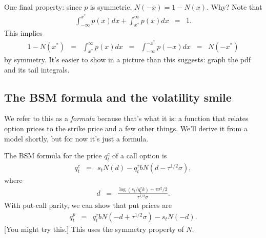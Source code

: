 \documentclass[11pt]{article}
\begin{document}
One final property:  since $p$ is symmetric, $N(-x) = 1 - N(x)$.
Why?
Note that
\begin{eqnarray*}
\int_{-\infty}^{x^*} p(x) dx + \int_{x^*}^{\infty} p(x) dx &=& 1 .
\end{eqnarray*}
This implies
\begin{eqnarray*}
     1 - N(x^*) &=& \int_{x^*}^{\infty} p(x) dx \;\;=\;\; \int_{-\infty}^{-x^*} p(-x) dx
            \;\;=\;\; N(-x^*)
\end{eqnarray*}
by symmetry.
It's easier to show in a picture than this suggests:
graph the pdf and its tail integrals.


\subsection*{The BSM formula and the volatility smile}


We refer to this as a {\it formula\/} because that's what it is:
a function that relates option prices to the strike price
and a few other things.  We'll derive it from a model shortly,
but for now it's just a formula.

The BSM formula for the price $q^c_t$ of a call option is
\begin{eqnarray}
        q^c_t &=& s_t N(d) - q^\tau_t b N (d - \tau^{1/2}\sigma ),
        \label{eq:bsm-call}
\end{eqnarray}
where
\begin{eqnarray*}
          d &=& \frac{\log(s_t/q^\tau_t k) + \tau \sigma^2/2}{\tau^{1/2}\sigma} .
\end{eqnarray*}
With put-call parity, we can show that put prices are
\begin{eqnarray}
        q^p_t &=& q^\tau_t b N(-d + \tau^{1/2} \sigma) - s_t N(-d) .
        \label{eq:bsm-put}
\end{eqnarray}
[You might try this.]
This uses the symmetry property of $N$.
\end{document}
